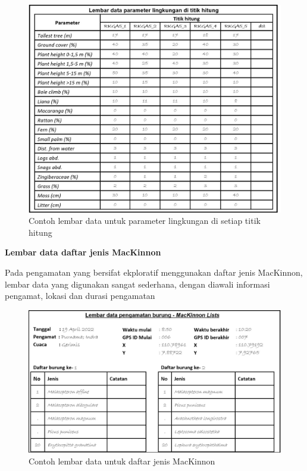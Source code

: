 \documentclass[
]{book}
\begin{document}
\begin{figure}

{\centering \includegraphics[width=1\linewidth]{images/ldp_pl} 

}

\caption{Contoh lembar data untuk parameter lingkungan di setiap titik hitung}\label{fig:ldppl}
\end{figure}

\textbf{Lembar data daftar jenis MacKinnon}

Pada pengamatan yang bersifat ekploratif menggunakan daftar jenis MacKinnon, lembar data yang digunakan sangat sederhana, dengan diawali informasi pengamat, lokasi dan durasi pengamatan

\begin{figure}

{\centering \includegraphics[width=1\linewidth]{images/ldp_ml} 

}

\caption{Contoh lembar data untuk daftar jenis MacKinnon}\label{fig:ldpml}
\end{figure}
\end{document}
